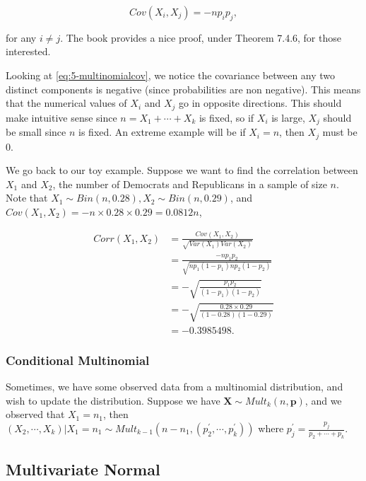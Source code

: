 \documentclass[
]{book}
\begin{document}
\begin{equation} 
Cov(X_i, X_j) = -n p_i p_j,
\label{eq:5-multinomialcov}
\end{equation}

for any \(i \neq j\). The book provides a nice proof, under Theorem 7.4.6, for those interested.

Looking at \eqref{eq:5-multinomialcov}, we notice the covariance between any two distinct components is negative (since probabilities are non negative). This means that the numerical values of \(X_i\) and \(X_j\) go in opposite directions. This should make intuitive sense since \(n = X_1 + \cdots + X_k\) is fixed, so if \(X_i\) is large, \(X_j\) should be small since \(n\) is fixed. An extreme example will be if \(X_i = n\), then \(X_j\) must be 0.

We go back to our toy example. Suppose we want to find the correlation between \(X_1\) and \(X_2\), the number of Democrats and Republicans in a sample of size \(n\). Note that \(X_1 \sim Bin(n,0.28), X_2 \sim Bin(n,0.29)\), and \(Cov(X_1,X_2) = -n \times 0.28 \times 0.29 = 0.0812n\),

\[
\begin{split}
Corr(X_1,X_2) &= \frac{Cov(X_1,X_2)}{\sqrt{Var(X_1) Var(X_2)}}\\
 &= \frac{-n p_1 p_2}{\sqrt{n p_1 (1-p_1) n p_2 (1-p_2)}} \\
 &= -\sqrt{\frac{p_1 p_2}{(1-p_1)(1-p_2)}} \\
 &= -\sqrt{\frac{0.28 \times 0.29}{(1-0.28)(1-0.29)}} \\
 &= -0.3985498.
\end{split}
\]

\subsubsection{Conditional Multinomial}\label{conditional-multinomial}

Sometimes, we have some observed data from a multinomial distribution, and wish to update the distribution. Suppose we have \(\boldsymbol{X} \sim Mult_k(n, \boldsymbol{p})\), and we observed that \(X_1 = n_1\), then \((X_2, \cdots, X_k)|X_1 = n_1 \sim Mult_{k-1}(n-n_1, (p_2^{\prime}, \cdots, p_k^{\prime}))\) where \(p_j^{\prime} = \frac{p_j}{p_2 + \cdots + p_k}\).

\subsection{Multivariate Normal}\label{multivariate-normal}
\end{document}
